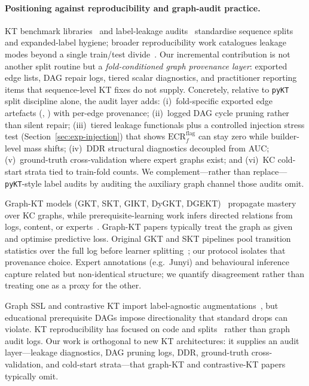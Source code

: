 \documentclass[pdflatex,sn-mathphys-num]{sn-jnl}
\newcommand{\DDR}{\textsc{DDR}}
\begin{document}
\paragraph{Positioning against reproducibility and graph-audit practice.}
KT benchmark libraries~\cite{liu2022pykt,abdelrahman2023kt_survey} and
label-leakage audits~\cite{badran2024labelleakage} standardise sequence splits
and expanded-label hygiene; broader reproducibility work catalogues leakage
modes beyond a single train/test divide~\cite{kaufman2012leakage,kapoor2023leakage}.
Our incremental contribution is not another split routine but a
\emph{fold-conditioned graph provenance layer}: exported edge lists, DAG repair
logs, tiered scalar diagnostics, and practitioner reporting items that
sequence-level KT fixes do not supply. Concretely, relative to
\texttt{pyKT}~\cite{liu2022pykt} split discipline alone, the audit layer adds:
(i)~fold-specific exported edge artefacts (,
) with per-edge provenance;
(ii)~logged DAG cycle pruning rather than silent repair;
(iii)~tiered leakage functionals plus a controlled injection stress test
(Section~\ref{sec:exp-injection}) that shows $\mathrm{ECR}^{\mathrm{flag}}_f$
can stay zero while builder-level mass shifts;
(iv)~\DDR{} structural diagnostics decoupled from AUC;
(v)~ground-truth cross-validation where expert graphs exist; and
(vi)~KC cold-start strata tied to train-fold counts. We complement---rather
than replace---\texttt{pyKT}-style label audits by auditing the auxiliary graph
channel those audits omit.

Graph-KT models (GKT, SKT, GIKT, DyGKT, DGEKT)~\cite{nakagawa2019gkt,tong2020skt,yang2021gikt,dygkt2024,dgekt2024}
propagate mastery over KC graphs, while prerequisite-learning work infers
directed relations from logs, content, or experts~\cite{lin2016moocprereq,bai2025survey,chang2015junyi}.
Graph-KT papers typically treat the graph as given and optimise predictive
loss. Original GKT and SKT pipelines pool transition statistics over the full
log before learner splitting~\cite{nakagawa2019gkt,tong2020skt}; our protocol
isolates that provenance choice. Expert annotations (e.g.\ Junyi) and
behavioural inference capture related but non-identical structure; we quantify
disagreement rather than treating one as a proxy for the other.

Graph SSL and contrastive KT import label-agnostic augmentations~\cite{you2020graphcl,lee2022cl4kt,kipf2017gcn},
but educational prerequisite DAGs impose directionality that standard drops can
violate. KT reproducibility has focused on code and splits~\cite{liu2022pykt}
rather than graph audit logs. Our work is orthogonal to new KT architectures: it
supplies an audit layer---leakage diagnostics, DAG pruning logs, \DDR{},
ground-truth cross-validation, and cold-start strata---that graph-KT and
contrastive-KT papers typically omit.
\end{document}
